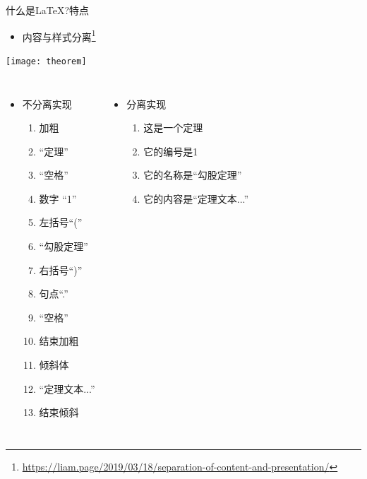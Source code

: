 \documentclass[fontset = none, xcolor=svgnames, t, aspectratio=169]{ctexbeamer}
\begin{document}
\begin{frame}[fragile]{什么是\LaTeX?}{特点}%
  \begin{itemize}
  \item 内容与样式分离\footnote[frame]{\href{https://liam.page/2019/03/18/separation-of-content-and-presentation/}{https://liam.page/2019/03/18/separation-of-content-and-presentation/}}
  \end{itemize}  
  \begin{center}
  \begin{minipage}[c]{0.9\linewidth}
    \texttt{[image: theorem]}    
  \end{minipage}
  \end{center}
  \vspace{-1ex}
  \begin{spacing}{1.05}
  \begin{columns}[T]
    \begin{itemize}
    \item 不分离实现      
      \begin{enumerate}
        \scriptsize
      \item 加粗
      \item \enquote{定理}
      \item \enquote{空格}
      \item 数字 \enquote{1}
      \item 左括号\enquote{(}
      \item \enquote{勾股定理}
      \item 右括号\enquote{)}
      \item 句点\enquote{.}
      \item \enquote{空格}
      \item 结束加粗
      \item 倾斜体
      \item \enquote{定理文本...}
      \item 结束倾斜
      \end{enumerate}
    \end{itemize}
    \begin{itemize}
    \item 分离实现
      \begin{enumerate}
        \scriptsize
      \item 这是一个定理
      \item 它的编号是1
      \item 它的名称是\enquote{勾股定理}
      \item 它的内容是\enquote{定理文本...}

\end{enumerate}
\end{itemize}
\end{columns}
\end{spacing}
\end{frame}
\end{document}
